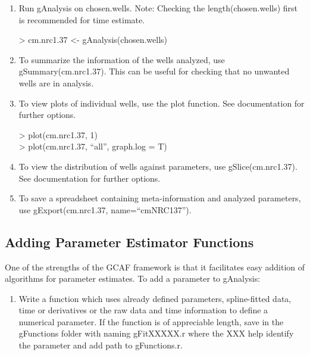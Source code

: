 \documentclass[11pt]{article}
\newenvironment{example}
{\ttfamily \footnotesize >}
{\normalsize \rmfamily}
\newcommand{\inlex}[1]{\ttfamily\small{#1}\rmfamily}
\begin{document}
\begin{spacing}{.1}
\begin{enumerate}
\item Run \inlex{gAnalysis} on \inlex{chosen.wells}. \footnotesize{Note: Checking the \inlex{length(chosen.wells)} first is recommended for time estimate}.

\begin{example}
cm.nrc1.37 <- gAnalysis(chosen.wells)
\end{example}

\item To summarize the information of the wells analyzed, use \inlex{gSummary(cm.nrc1.37)}. This can be useful for checking that no unwanted wells are in analysis.

\item To view plots of individual wells, use the plot function. See documentation for further options.

\begin{example}
plot(cm.nrc1.37, 1)\\
> plot(cm.nrc1.37, ``all'', graph.log = T)
\end{example}

\item To view the distribution of wells against parameters, use \inlex{gSlice(cm.nrc1.37)}. See documentation for further options.

\item To save a spreadsheet containing meta-information and analyzed parameters, use \inlex{gExport(cm.nrc1.37, name=``cmNRC137'')}.

\end{enumerate}


\subsection{Adding Parameter Estimator Functions}

One of the strengths of the GCAF framework is that it facilitates easy addition of algorithms for parameter estimates. To add a parameter to \inlex{gAnalysis}:

\begin{enumerate}
\item Write a function which uses already defined parameters, spline-fitted data, time or derivatives or the raw data and time information to define a numerical parameter. If the function is of appreciable length, save in the \inlex{gFunctions} folder with naming \inlex{gFitXXXXX.r} where the XXX help identify the parameter and add path to \inlex{gFunctions.r}.


\end{enumerate}
\end{spacing}
\end{document}

